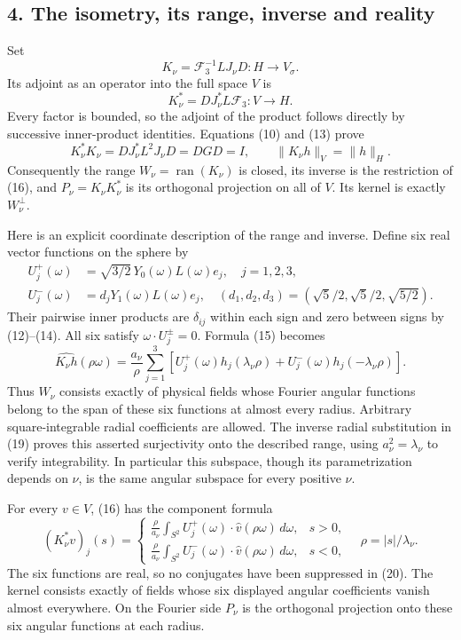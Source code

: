 \subsection*{4. The isometry, its range, inverse and reality}

Set \[
K_\nu=\mathcal F_3^{-1}LJ_\nu D:H\longrightarrow V_\sigma.
\tag{15}
\] Its adjoint as an operator into the full space \(V\) is \[
K_\nu^*=D J_\nu^*L\mathcal F_3:V\longrightarrow H.
\tag{16}
\] Every factor is bounded, so the adjoint of the product follows directly by successive inner-product identities. Equations (10) and (13) prove \[
K_\nu^*K_\nu=D J_\nu^*L^2J_\nu D=DGD=I,
\qquad\|K_\nu h\|_V=\|h\|_H.
\tag{17}
\] Consequently the range \(W_\nu=\operatorname{ran}(K_\nu)\) is closed, its inverse is the restriction of (16), and \(P_\nu=K_\nu K_\nu^*\) is its orthogonal projection on all of \(V\). Its kernel is exactly \(W_\nu^\perp\).

Here is an explicit coordinate description of the range and inverse. Define six real vector functions on the sphere by \[
\begin{aligned}
U_j^+(\omega)&=\sqrt{3/2}\,Y_0(\omega)L(\omega)e_j,\quad j=1,2,3,\\
U_j^-(\omega)&=d_jY_1(\omega)L(\omega)e_j,\quad
(d_1,d_2,d_3)=(\sqrt5/2,\sqrt5/2,\sqrt{5/2}).
\end{aligned}
\tag{18}
\] Their pairwise inner products are \(\delta_{ij}\) within each sign and zero between signs by (12)--(14). All six satisfy \(\omega\cdot U_j^\pm=0\). Formula (15) becomes \[
\widehat{K_\nu h}(\rho\omega)=\frac{a_\nu}{\rho}
\sum_{j=1}^3\left[U_j^+(\omega)h_j(\lambda_\nu\rho)
+U_j^-(\omega)h_j(-\lambda_\nu\rho)\right].
\tag{19}
\] Thus \(W_\nu\) consists exactly of physical fields whose Fourier angular functions belong to the span of these six functions at almost every radius. Arbitrary square-integrable radial coefficients are allowed. The inverse radial substitution in (19) proves this asserted surjectivity onto the described range, using \(a_\nu^2=\lambda_\nu\) to verify integrability. In particular this subspace, though its parametrization depends on \(\nu\), is the same angular subspace for every positive \(\nu\).

For every \(v\in V\), (16) has the component formula \[
(K_\nu^*v)_j(s)=
\begin{cases}
\displaystyle\frac\rho{a_\nu}\int_{S^2}U_j^+(\omega)\cdot\widehat v(\rho\omega)\,d\omega,&s>0,\\
\displaystyle\frac\rho{a_\nu}\int_{S^2}U_j^-(\omega)\cdot\widehat v(\rho\omega)\,d\omega,&s<0,
\end{cases}
\quad \rho=|s|/\lambda_\nu.
\tag{20}
\] The six functions are real, so no conjugates have been suppressed in (20). The kernel consists exactly of fields whose six displayed angular coefficients vanish almost everywhere. On the Fourier side \(P_\nu\) is the orthogonal projection onto these six angular functions at each radius.


